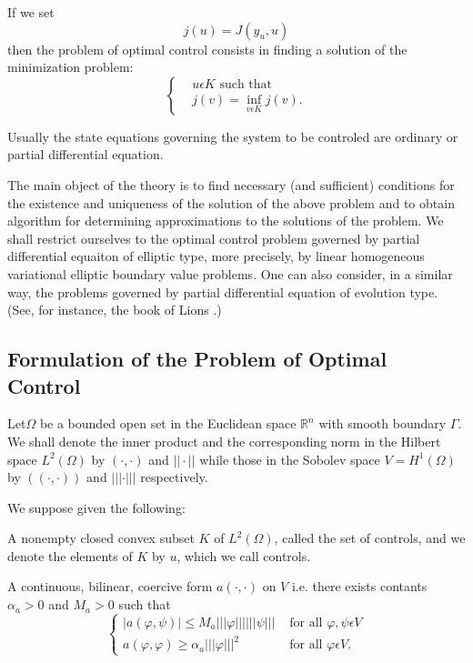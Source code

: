 If we set
$$
j(u) = J(y_{u}, u)
$$
then the problem of optimal control consists in finding a solution of the minimization problem:
\begin{equation*}
\begin{cases}
& u \epsilon K \text{ such that}\\
& j(v) = \inf_{v \epsilon K} j(v).
\end{cases}
\end{equation*}

Usually the state equations governing the system to be controled are
ordinary or partial differential equation. 

The main object of the theory is to find necessary (and sufficient)
conditions for the existence and uniqueness of the solution of the
above problem and to obtain algorithm for determining approximations
to the solutions of the problem. We shall restrict ourselves to the
optimal control problem governed by partial differential equaiton of
elliptic type, more precisely, by linear homogeneous variational
elliptic boundary value problems. One can also consider, in a similar
way, the problems governed by partial differential equation of
evolution type. (See, for instance, the book of Lions \cite{key31}.) 

\subsection{Formulation of the Problem of Optimal Control}\label{chap6-subsec1.1}

Let\pageoriginale $\Omega$ be a bounded open set in the Euclidean
space $\mathbb{R}^{n}$ with smooth boundary $\Gamma$. We shall denote
the inner product and the corresponding norm in the Hilbert space
$L^{2} (\Omega)$ by $(\cdot , \cdot)$ and $|| \cdot ||$ while those in
the Sobolev space $V = H^{1} (\Omega)$ by $((\cdot , \cdot))$ and $|||
\cdot |||$ respectively. 

We suppose given the following:

\medskip
{} A nonempty closed convex subset
$K$ of $L^{2} (\Omega)$, called the set of controls, and we denote the
elements of $K$ by $u$, which we call controls. 

\medskip
{} A continuous, bilinear, coercive
form $a(\cdot , \cdot)$ on $V$ i.e. there exists contants $\alpha_{a}
> 0$ and $M_{a} > 0$ such that 
\begin{equation*}
\begin{cases}
|a(\varphi, \psi)| \leq M_{a} |||\varphi||| |||\psi||| & \text{ for all } \varphi, \psi \epsilon V\\
a(\varphi, \varphi) \geq \alpha_{a} |||\varphi|||^{2} & \text{ for all } \varphi \epsilon V.\tag{1.1}\label{chap6-eq1.1}
\end{cases}
\end{equation*}

